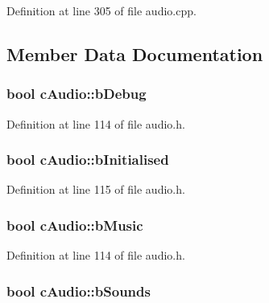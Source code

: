 Definition at line 305 of file audio.\-cpp.



\subsection{Member Data Documentation}
\hypertarget{classc_audio_ab36788ba00195b8c4917e2e304d85b0d}{
\subsubsection[{b\-Debug}]{\setlength{\rightskip}{0pt plus 5cm}bool c\-Audio\-::b\-Debug}}\label{classc_audio_ab36788ba00195b8c4917e2e304d85b0d}


Definition at line 114 of file audio.\-h.

\hypertarget{classc_audio_acb49d8cf5904830d9307bc426fe4cb3d}{
\subsubsection[{b\-Initialised}]{\setlength{\rightskip}{0pt plus 5cm}bool c\-Audio\-::b\-Initialised}}\label{classc_audio_acb49d8cf5904830d9307bc426fe4cb3d}


Definition at line 115 of file audio.\-h.

\hypertarget{classc_audio_abe75bf46e35f528400dcb2e5113ae0b8}{
\subsubsection[{b\-Music}]{\setlength{\rightskip}{0pt plus 5cm}bool c\-Audio\-::b\-Music}}\label{classc_audio_abe75bf46e35f528400dcb2e5113ae0b8}


Definition at line 114 of file audio.\-h.

\hypertarget{classc_audio_a5ad87dd6c804f68dd430f778f90cf38e}{
\subsubsection[{b\-Sounds}]{\setlength{\rightskip}{0pt plus 5cm}bool c\-Audio\-::b\-Sounds}}\label{classc_audio_a5ad87dd6c804f68dd430f778f90cf38e}


